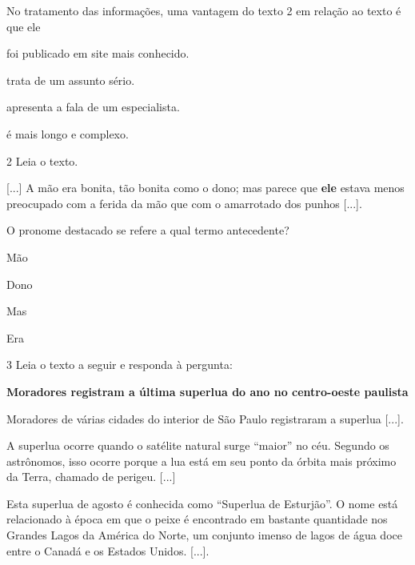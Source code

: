 \pagebreak
No tratamento das informações, uma vantagem do texto 2 em relação ao texto é que ele

\begin{escolha}
\item foi publicado em site mais conhecido.

\item trata de um assunto sério.

\item apresenta a fala de um especialista.

\item é mais longo e complexo.
\end{escolha}



\num{2} Leia o texto.

\begin{myquote}
{[}...{]} A mão era bonita, tão bonita como o dono; mas parece que
\textbf{ele} estava menos preocupado com a ferida da mão que com o
amarrotado dos punhos {[}...{]}.

\end{myquote}

O pronome destacado se refere a qual termo antecedente?

\begin{escolha}
\item Mão

\item Dono

\item Mas

\item Era
\end{escolha}


\num{3} Leia o texto a seguir e responda à pergunta:
\enlargethispage{3\baselineskip}

\begin{myquote}
\textbf{Moradores registram a última superlua do ano no centro-oeste
paulista}

Moradores de várias cidades do interior de São Paulo registraram a
superlua {[}...{]}.

A superlua ocorre quando o satélite natural surge “maior” no céu.
Segundo os astrônomos, isso ocorre porque a lua está em seu ponto da
órbita mais próximo da Terra, chamado de perigeu.
{[}...{]}

Esta superlua de agosto é conhecida como “Superlua de Esturjão”. O
nome está relacionado à época em que o peixe é encontrado em bastante
quantidade nos Grandes Lagos da América do Norte, um conjunto imenso de
lagos de água doce entre o Canadá e os Estados Unidos.
{[}...{]}.

\end{myquote}

